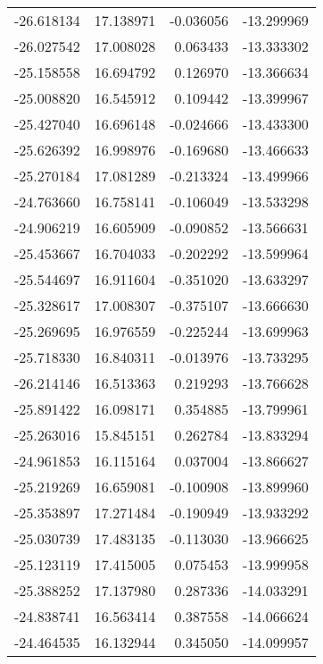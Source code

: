 \begin{tabular}{rrrr}
      -26.618134 &        17.138971 &   -0.036056 & -13.299969 \\
      -26.027542 &        17.008028 &    0.063433 & -13.333302 \\
      -25.158558 &        16.694792 &    0.126970 & -13.366634 \\
      -25.008820 &        16.545912 &    0.109442 & -13.399967 \\
      -25.427040 &        16.696148 &   -0.024666 & -13.433300 \\
      -25.626392 &        16.998976 &   -0.169680 & -13.466633 \\
      -25.270184 &        17.081289 &   -0.213324 & -13.499966 \\
      -24.763660 &        16.758141 &   -0.106049 & -13.533298 \\
      -24.906219 &        16.605909 &   -0.090852 & -13.566631 \\
      -25.453667 &        16.704033 &   -0.202292 & -13.599964 \\
      -25.544697 &        16.911604 &   -0.351020 & -13.633297 \\
      -25.328617 &        17.008307 &   -0.375107 & -13.666630 \\
      -25.269695 &        16.976559 &   -0.225244 & -13.699963 \\
      -25.718330 &        16.840311 &   -0.013976 & -13.733295 \\
      -26.214146 &        16.513363 &    0.219293 & -13.766628 \\
      -25.891422 &        16.098171 &    0.354885 & -13.799961 \\
      -25.263016 &        15.845151 &    0.262784 & -13.833294 \\
      -24.961853 &        16.115164 &    0.037004 & -13.866627 \\
      -25.219269 &        16.659081 &   -0.100908 & -13.899960 \\
      -25.353897 &        17.271484 &   -0.190949 & -13.933292 \\
      -25.030739 &        17.483135 &   -0.113030 & -13.966625 \\
      -25.123119 &        17.415005 &    0.075453 & -13.999958 \\
      -25.388252 &        17.137980 &    0.287336 & -14.033291 \\
      -24.838741 &        16.563414 &    0.387558 & -14.066624 \\
      -24.464535 &        16.132944 &    0.345050 & -14.099957 \\

\end{tabular}
